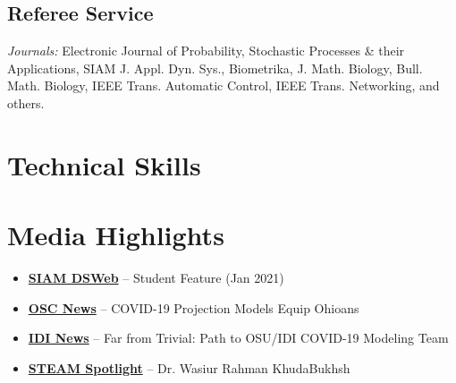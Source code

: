 \documentclass[11pt,a4paper,sans]{moderncv}
\begin{document}
\subsection{Referee Service}
\textit{Journals:} Electronic Journal of Probability, Stochastic Processes \& their Applications, SIAM J. Appl. Dyn. Sys., Biometrika, J. Math. Biology, Bull. Math. Biology, IEEE Trans. Automatic Control, IEEE Trans. Networking, and others.

\section{ Technical Skills}

\begin{cvcolumns}
\end{cvcolumns}

\section{ Media Highlights}

\begin{itemize}
    \item \href{https://dsweb.siam.org/The-Magazine/Article/student-feature-wasiur-rahman-khuda-bukhsh}{\textbf{SIAM DSWeb}} -- Student Feature (Jan 2021)
    \item \href{https://www.osc.edu/press/pandemic_modeling_covid_19_projection_models_equip_ohioans}{\textbf{OSC News}} -- COVID-19 Projection Models Equip Ohioans
    \item \href{https://idi.osu.edu/news-articles/far-from-trivial}{\textbf{IDI News}} -- Far from Trivial: Path to OSU/IDI COVID-19 Modeling Team
    \item \href{https://www.youtube.com/watch?v=j_DEgauzw7w}{\textbf{STEAM Spotlight}} -- Dr. Wasiur Rahman KhudaBukhsh
\end{itemize}
\end{document}

